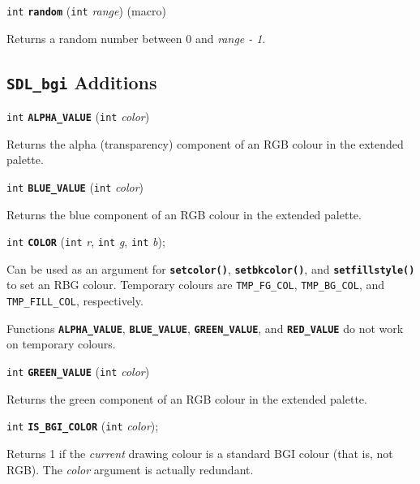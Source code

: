 \documentclass[a4paper,11pt]{article}
\newcommand{\SDLbgi}{\texttt{SDL\_bgi}}
\newcommand{\I}{\texttt{int}}       %
\newcommand{\func}[1]{\textbf{\texttt{#1}}}  %
\newcommand{\A}[1]{\emph{#1}}       %
\newcommand{\T}[1]{\texttt{#1}}     %
\newenvironment{bgi}
{ %
  \begin{snugshade}
}
{ %
  \end{snugshade}
}
\begin{document}

\begin{bgi}
\I{} \func{random} (\I{} \A{range}) (macro)
\end{bgi}

Returns a random number between 0 and \A{range - 1}.


\subsection{\SDLbgi{} Additions}

\begin{bgi}
\I{} \func{ALPHA\_VALUE} (\I{} \A{color})
\end{bgi}

Returns the alpha (transparency) component of an RGB colour in the
extended palette.



\begin{bgi}
\I{} \func{BLUE\_VALUE} (\I{} \A{color})
\end{bgi}

Returns the blue component of an RGB colour in the extended palette.


\begin{bgi}
\I{} \func{COLOR} (\I{} \A{r}, \I{} \A{g}, \I{} \A{b});
\end{bgi}

Can be used as an argument for \func{setcolor()}, \func{setbkcolor()},
and \func{setfillstyle()} to set an RBG colour. Temporary colours are
\T{TMP\_FG\_COL}, \T{TMP\_BG\_COL}, and \T{TMP\_FILL\_COL},
respectively.

Functions \func{ALPHA\_VALUE}, \func{BLUE\_VALUE},
\func{GREEN\_VALUE}, and \func{RED\_VALUE} do not work on temporary
colours.


\begin{bgi}
\I{} \func{GREEN\_VALUE} (\I{} \A{color})
\end{bgi}

Returns the green component of an RGB colour in the extended palette.


\begin{bgi}
\I{} \func{IS\_BGI\_COLOR} (\I{} \A{color});
\end{bgi}

Returns 1 if the \emph{current} drawing colour is a standard BGI
colour (that is, not RGB). The \A{color} argument is actually
redundant.
\end{document}
